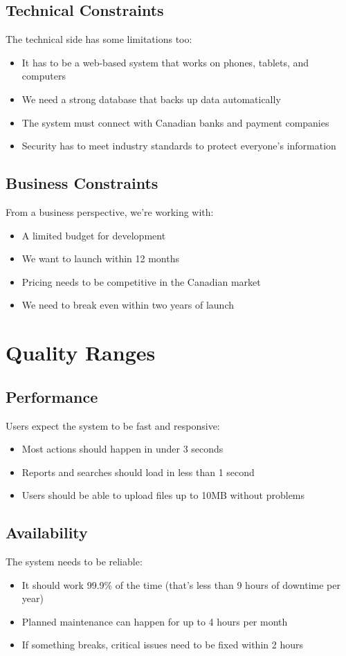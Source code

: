 \documentclass[12pt]{article}
\begin{document}
\subsection{Technical Constraints}
The technical side has some limitations too:
\begin{itemize}
    \item It has to be a web-based system that works on phones, tablets, and computers
    \item We need a strong database that backs up data automatically
    \item The system must connect with Canadian banks and payment companies
    \item Security has to meet industry standards to protect everyone's information
\end{itemize}

\subsection{Business Constraints}
From a business perspective, we're working with:
\begin{itemize}
    \item A limited budget for development
    \item We want to launch within 12 months
    \item Pricing needs to be competitive in the Canadian market
    \item We need to break even within two years of launch
\end{itemize}

\section{Quality Ranges}

\subsection{Performance}
Users expect the system to be fast and responsive:
\begin{itemize}
    \item Most actions should happen in under 3 seconds
    \item Reports and searches should load in less than 1 second
    \item Users should be able to upload files up to 10MB without problems
\end{itemize}

\subsection{Availability}
The system needs to be reliable:
\begin{itemize}
    \item It should work 99.9\% of the time (that's less than 9 hours of downtime per year)
    \item Planned maintenance can happen for up to 4 hours per month
    \item If something breaks, critical issues need to be fixed within 2 hours
\end{itemize}
\end{document}
